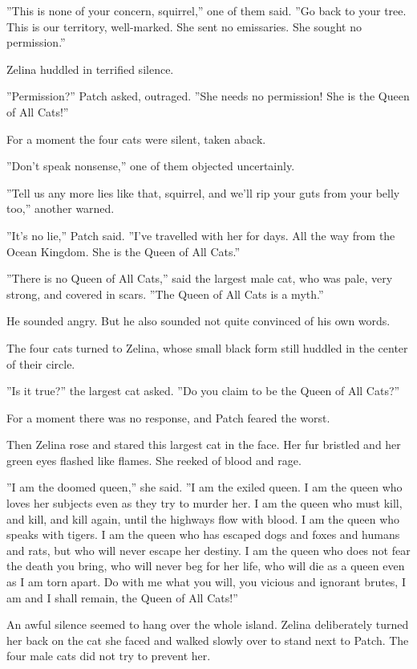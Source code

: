 \documentclass[12pt]{book}
\begin{document}
''This is none of your concern, squirrel,'' one of them said. ''Go back to your tree. This is our territory, well-marked. She sent no emissaries. She sought no permission.''

Zelina huddled in terrified silence.

''Permission?'' Patch asked, outraged. ''She needs no permission! She is the Queen of All Cats!''

For a moment the four cats were silent, taken aback.

''Don't speak nonsense,'' one of them objected uncertainly.

''Tell us any more lies like that, squirrel, and we'll rip your guts from your belly too,'' another warned.

''It's no lie,'' Patch said. ''I've travelled with her for days. All the way from the Ocean Kingdom. She is the Queen of All Cats.''

''There is no Queen of All Cats,'' said the largest male cat, who was pale, very strong, and covered in scars. ''The Queen of All Cats is a myth.''

He sounded angry. But he also sounded not quite convinced of his own words.

The four cats turned to Zelina, whose small black form still huddled in the center of their circle.

''Is it true?'' the largest cat asked. ''Do you claim to be the Queen of All Cats?''

For a moment there was no response, and Patch feared the worst.

Then Zelina rose and stared this largest cat in the face. Her fur bristled and her green eyes flashed like flames. She reeked of blood and rage.

''I am the doomed queen,'' she said. ''I am the exiled queen. I am the queen who loves her subjects even as they try to murder her. I am the queen who must kill, and kill, and kill again, until the highways flow with blood. I am the queen who speaks with tigers. I am the queen who has escaped dogs and foxes and humans and rats, but who will never escape her destiny. I am the queen who does not fear the death you bring, who will never beg for her life, who will die as a queen even as I am torn apart. Do with me what you will, you vicious and ignorant brutes, I am and I shall remain, the Queen of All Cats!''

An awful silence seemed to hang over the whole island. Zelina deliberately turned her back on the cat she faced and walked slowly over to stand next to Patch. The four male cats did not try to prevent her.
\end{document}

